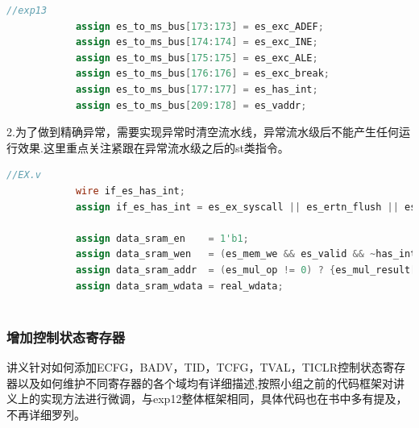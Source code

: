 \documentclass[12pt,a4paper]{article}
\begin{document}
            \begin{lstlisting}[language=Verilog]
            //exp13
            assign es_to_ms_bus[173:173] = es_exc_ADEF;
            assign es_to_ms_bus[174:174] = es_exc_INE;
            assign es_to_ms_bus[175:175] = es_exc_ALE;
            assign es_to_ms_bus[176:176] = es_exc_break;
            assign es_to_ms_bus[177:177] = es_has_int;
            assign es_to_ms_bus[209:178] = es_vaddr;
          \end{lstlisting}
          2.为了做到精确异常，需要实现异常时清空流水线，异常流水级后不能产生任何运行效果.这里重点关注紧跟在异常流水级之后的st类指令。
          \begin{lstlisting}[language=Verilog]
          //EX.v
            wire if_es_has_int;
            assign if_es_has_int = es_ex_syscall || es_ertn_flush || es_exc_ADEF || es_exc_ALE || es_exc_INE || es_exc_break || es_has_int || wb_ex;
            
            assign data_sram_en    = 1'b1;   
            assign data_sram_wen   = (es_mem_we && es_valid && ~has_int && ~if_ms_has_int && ~wb_ex && ~if_es_has_int & ~ertn_flush & ~es_ertn_flush) ? w_strb : 4'b0000;
            assign data_sram_addr  = (es_mul_op != 0) ? {es_mul_result[31:2],2'b00} : {es_alu_result[31:2],2'b00};
            assign data_sram_wdata = real_wdata;        
            
          \end{lstlisting}
        
        \subsubsection{增加控制状态寄存器}
        讲义针对如何添加ECFG，BADV，TID，TCFG，TVAL，TICLR控制状态寄存器以及如何维护不同寄存器的各个域均有详细描述,按照小组之前的代码框架对讲义上的实现方法进行微调，与exp12整体框架相同，具体代码也在书中多有提及，不再详细罗列。
\end{document}
